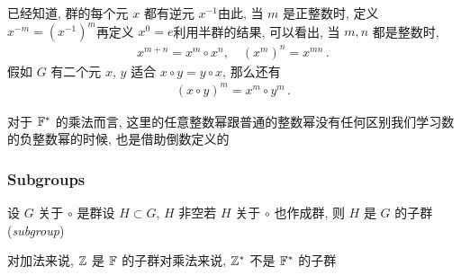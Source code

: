 \begin{definition}
    已经知道, 群的每个元 $x$ 都有逆元 $x^{-1}$\period 由此, 当 $m$ 是正整数时, 定义 $x^{-m} = (x^{-1})^m$\period 再定义 $x^0 = e$\period 利用半群的结果, 可以看出, 当 $m,n$ 都是整数时,
    \begin{align*}
        x^{m+n} = x^m \circ x^n, \quad (x^m)^n = x^{mn} \period
    \end{align*}
    假如 $G$ 有二个元 $x$, $y$ 适合 $x \circ y = y \circ x$, 那么还有
    \begin{align*}
        (x \circ y)^m = x^m \circ y^m \period
    \end{align*}
\end{definition}

\begin{example}
    对于 $\mathbb{F}^{\ast}$ 的乘法而言, 这里的任意整数幂跟普通的整数幂没有任何区别\period 我们学习数的负整数幂的时候, 也是借助倒数定义的\period
\end{example}

\subsubsection*{Subgroups}

\begin{definition}
    设 $G$ 关于 $\circ$ 是群\period 设 $H \subset G$, $H$ 非空\period 若 $H$ 关于 $\circ$ 也作成群, 则 $H$ 是 $G$ 的子群 (\textit{subgroup})\period
\end{definition}

\begin{example}
    对加法来说, $\mathbb{Z}$ 是 $\mathbb{F}$ 的子群\period 对乘法来说, $\mathbb{Z}^{\ast}$ 不是 $\mathbb{F}^{\ast}$ 的子群\period
\end{example}

